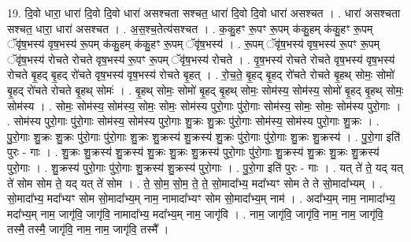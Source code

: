 \documentclass[17pt]{extarticle}
\begin{document}
19. दि॒वो धारा॒ धारा॑ दि॒वो दि॒वो धारा॑ असश्चता सश्चत॒ धारा॑ दि॒वो दि॒वो धारा॑ असश्चत । . धारा॑ असश्चता सश्चत॒ धारा॒ धारा॑ असश्चत । . अ॒स॒श्च॒तेत्य॑सश्चत । . क॒कु॒हꣳ रू॒पꣳ रू॒पम् क॑कु॒हम् क॑कु॒हꣳ रू॒पम् ॅवृ॑ष॒भस्य॑ वृष॒भस्य॑ रू॒पम् क॑कु॒हम् क॑कु॒हꣳ रू॒पम् ॅवृ॑ष॒भस्य॑ । . रू॒पम् ॅवृ॑ष॒भस्य॑ वृष॒भस्य॑ रू॒पꣳ रू॒पम् ॅवृ॑ष॒भस्य॑ रोचते रोचते वृष॒भस्य॑ रू॒पꣳ रू॒पम् ॅवृ॑ष॒भस्य॑ रोचते । . वृ॒ष॒भस्य॑ रोचते रोचते वृष॒भस्य॑ वृष॒भस्य॑ रोचते बृ॒हद् बृ॒हद् रो॑चते वृष॒भस्य॑ वृष॒भस्य॑ रोचते बृ॒हत् । . रो॒च॒ते॒ बृ॒हद् बृ॒हद् रो॑चते रोचते बृ॒हथ् सोमः॒ सोमो॑ बृ॒हद् रो॑चते रोचते बृ॒हथ् सोमः॑ । . बृ॒हथ् सोमः॒ सोमो॑ बृ॒हद् बृ॒हथ् सोमः॒ सोम॑स्य॒ सोम॑स्य॒ सोमो॑ बृ॒हद् बृ॒हथ् सोमः॒ सोम॑स्य । . सोमः॒ सोम॑स्य॒ सोम॑स्य॒ सोमः॒ सोमः॒ सोम॑स्य पुरो॒गाः पु॑रो॒गाः सोम॑स्य॒ सोमः॒ सोमः॒ सोम॑स्य पुरो॒गाः । . सोम॑स्य पुरो॒गाः पु॑रो॒गाः सोम॑स्य॒ सोम॑स्य पुरो॒गाः शु॒क्रः शु॒क्रः पु॑रो॒गाः सोम॑स्य॒ सोम॑स्य पुरो॒गाः शु॒क्रः । . पु॒रो॒गाः शु॒क्रः शु॒क्रः पु॑रो॒गाः पु॑रो॒गाः शु॒क्रः शु॒क्रस्य॑ शु॒क्रस्य॑ शु॒क्रः पु॑रो॒गाः पु॑रो॒गाः शु॒क्रः शु॒क्रस्य॑ । . पु॒रो॒गा इति॑ पुरः - गाः । . शु॒क्रः शु॒क्रस्य॑ शु॒क्रस्य॑ शु॒क्रः शु॒क्रः शु॒क्रस्य॑ पुरो॒गाः पु॑रो॒गाः शु॒क्रस्य॑ शु॒क्रः शु॒क्रः शु॒क्रस्य॑ पुरो॒गाः । . शु॒क्रस्य॑ पुरो॒गाः पु॑रो॒गाः शु॒क्रस्य॑ शु॒क्रस्य॑ पुरो॒गाः । . पु॒रो॒गा इति॑ पुरः - गाः । . यत् ते॑ ते॒ यद् यत् ते॑ सोम सोम ते॒ यद् यत् ते॑ सोम । . ते॒ सो॒म॒ सो॒म॒ ते॒ ते॒ सो॒मादा᳚भ्य॒ मदा᳚भ्यꣳ सोम ते ते सो॒मादा᳚भ्यम् । . सो॒मादा᳚भ्य॒ मदा᳚भ्यꣳ सोम सो॒मादा᳚भ्य॒म् नाम॒ नामादा᳚भ्यꣳ सोम सो॒मादा᳚भ्य॒म् नाम॑ । . अदा᳚भ्य॒म् नाम॒ नामादा᳚भ्य॒ मदा᳚भ्य॒म् नाम॒ जागृ॑वि॒ जागृ॑वि॒ नामादा᳚भ्य॒ मदा᳚भ्य॒म् नाम॒ जागृ॑वि । . नाम॒ जागृ॑वि॒ जागृ॑वि॒ नाम॒ नाम॒ जागृ॑वि॒ तस्मै॒ तस्मै॒ जागृ॑वि॒ नाम॒ नाम॒ जागृ॑वि॒ तस्मै᳚ । \newline
\end{document}
